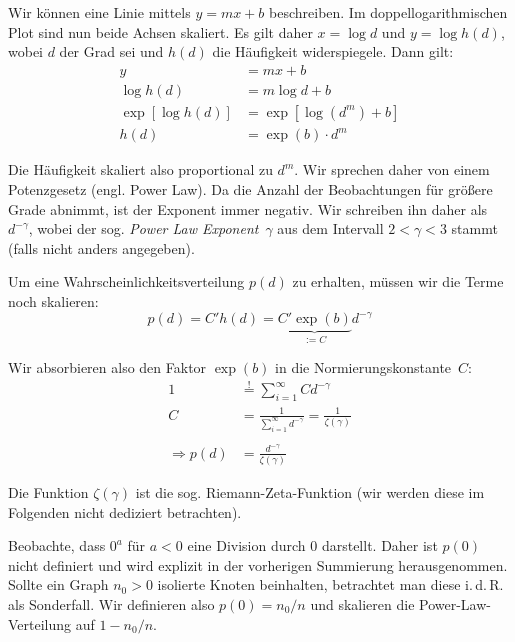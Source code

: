 Wir können eine Linie mittels $y = mx + b$ beschreiben.
Im doppellogarithmischen Plot sind nun beide Achsen skaliert.
Es gilt daher $x = \log d$ und $y = \log h(d)$, wobei $d$ der Grad sei und $h(d)$ die Häufigkeit widerspiegele.
Dann gilt:
\begin{align}
    y               & = mx + b              \\
    \log h(d)       & = m\log d + b         \\
    \exp[\log h(d)] & = \exp[\log(d^m) + b] \\
    h(d)            & = \exp(b) \cdot d^m
\end{align}

Die Häufigkeit skaliert also proportional zu $d^m$.
Wir  sprechen daher von einem Potenzgesetz (engl. Power Law).
Da die Anzahl der Beobachtungen für größere Grade abnimmt, ist der Exponent immer negativ.
Wir schreiben ihn daher als $d^{-\gamma}$, wobei der sog. \emph{Power Law Exponent}~$\gamma$ aus dem Intervall $2 < \gamma < 3$ stammt (falls nicht anders angegeben).

Um eine Wahrscheinlichkeitsverteilung $p(d)$ zu erhalten, müssen wir die Terme noch skalieren:
\begin{equation}
    p(d) = C' h(d) = \underbrace{C'\exp(b)}_{:= C} d^{-\gamma}
\end{equation}

\noindent
Wir absorbieren also den Faktor $\exp(b)$ in die Normierungskonstante~$C$:
\begin{align}
    1                & \stackrel{!}{=} \sum_{i=1}^\infty C d^{-\gamma}                          \\
    C                & = \frac{1}{\sum_{i=1}^\infty d^{-\gamma}}      = \frac{1}{\zeta(\gamma)} \\
    \nonumber                                                                                   \\
    \Rightarrow p(d) & = \frac{d^{-\gamma}}{\zeta(\gamma)}
\end{align}

Die Funktion $\zeta(\gamma)$ ist die sog. Riemann-Zeta-Funktion (wir werden diese im Folgenden nicht dediziert betrachten).

Beobachte, dass $0^a$ für $a < 0$ eine Division durch $0$ darstellt.
Daher ist $p(0)$ nicht definiert und wird explizit in der vorherigen Summierung herausgenommen.
Sollte ein Graph $n_0>0$ isolierte Knoten beinhalten, betrachtet man diese i.\,d.\,R. als Sonderfall.
Wir definieren also $p(0) = n_0 / n$ und skalieren die Power-Law-Verteilung auf $1  - n_0 /n$.


